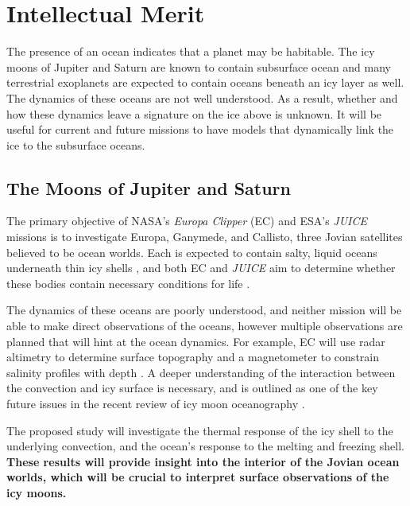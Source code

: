 \documentclass[12pt]{article}
\begin{document}
\section{Intellectual Merit}
The presence of an ocean indicates that a planet may be habitable\citep{tB24}. The icy moons of Jupiter and Saturn are known to contain subsurface ocean and many terrestrial exoplanets are expected to contain oceans beneath an icy layer as well\citep{lQ20}. The dynamics of these oceans are not well understood. As a result, whether and how these dynamics leave a signature on the ice above is unknown. It will be useful for current and future missions to have models that dynamically link the ice to the subsurface oceans.

\subsection{The Moons of Jupiter and Saturn}
The primary objective of NASA's \textit{Europa Clipper} (EC)\cite{pC14_EC} and ESA's \textit{JUICE} \citep{oG13} missions is to investigate Europa, Ganymede, and Callisto, three Jovian satellites believed to be ocean worlds. Each is expected to contain salty, liquid oceans underneath thin icy shells \citep{rP99,fN16}, and both EC and \textit{JUICE} aim to determine whether these bodies contain necessary conditions for life \citep{tB24}. 

The dynamics of these oceans are poorly understood, and neither mission will be able to make direct observations of the oceans, however multiple observations are planned that will hint at the ocean dynamics. For example, EC will use radar altimetry to determine surface topography and a magnetometer to constrain salinity profiles with depth \citep{jR23}.  
A deeper understanding of the interaction between the convection and icy surface is necessary, and is outlined as one of the key future issues in the recent review of icy moon oceanography \citep{kS24}.


The proposed study will investigate the thermal response of the icy shell to the underlying convection, and the ocean's response to the melting and freezing shell. 
\textbf{These results will provide insight into the interior of the Jovian ocean worlds, which will be crucial to interpret surface observations of the icy moons.}
\end{document}

